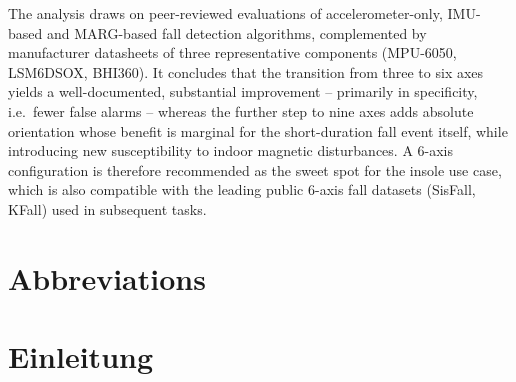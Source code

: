 \documentclass[11pt,a4paper,oneside]{report}
\begin{document}
The analysis draws on peer-reviewed evaluations of accelerometer-only, IMU-based and
MARG-based fall detection algorithms, complemented by manufacturer datasheets of
three representative components (MPU-6050, LSM6DSOX, BHI360). It concludes that the
transition from three to six axes yields a well-documented, substantial improvement
-- primarily in specificity, i.e.\ fewer false alarms -- whereas the further step
to nine axes adds absolute orientation whose benefit is marginal for the
short-duration fall event itself, while introducing new susceptibility to indoor
magnetic disturbances. A 6-axis configuration is therefore recommended as the sweet
spot for the insole use case, which is also compatible with the leading public
6-axis fall datasets (SisFall, KFall) used in subsequent tasks.
\newpage

\setcounter{page}{3}

\tableofcontents
\newpage

\listoffigures
\listoftables
\newpage

\chapter*{Abbreviations}

\begin{acronym}
\end{acronym}
\newpage

\setcounter{page}{1}

\chapter{Einleitung}
\label{ch:intro}
\end{document}
